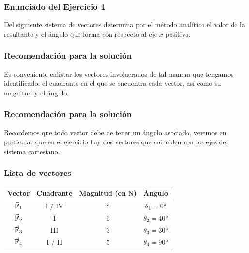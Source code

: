 \documentclass[14pt]{beamer}
\begin{document}
\begin{frame}
\frametitle{Enunciado del Ejercicio 1}
Del siguiente sistema de vectores determina por el método analítico el valor de la resultante y el ángulo que forma con respecto al eje $x$ positivo.
\end{frame}
\begin{frame}[plain]
\begin{figure}
\centering
{}
\end{figure}
\end{frame}
\begin{frame}
\frametitle{Recomendación para la solución}
Es conveniente enlistar los vectores involucrados de tal manera que tengamos identificado: el cuadrante en el que se encuentra cada vector, así como su magnitud y el ángulo.
\end{frame}
\begin{frame}
\frametitle{Recomendación para la solución}
Recordemos que todo vector debe de tener un ángulo asociado, veremos en particular que en el ejercicio hay dos vectores que coinciden con los ejes del sistema cartesiano.
\end{frame}
\begin{frame}
\frametitle{Lista de vectores}
\begin{table}
\centering
\begin{tabular}{c | c | c | c }
Vector & Cuadrante & Magnitud (en $\unit{\newton}$) & Ángulo \\ \hline
$\va{F}_{1}$ & I / IV & $8$ & $\theta_{1} = \ang{0}$ \\ \hline
$\va{F}_{2}$ & I & $6$ & $\theta_{2} = \ang{40}$ \\ \hline
$\va{F}_{3}$ & III & $3$ & $\theta_{3} = \ang{30}$ \\ \hline
$\va{F}_{4}$ & I / II & $5$ & $\theta_{4} = \ang{90}$ \\ \hline
\end{tabular}
\end{table}
\end{frame}
\end{document}
